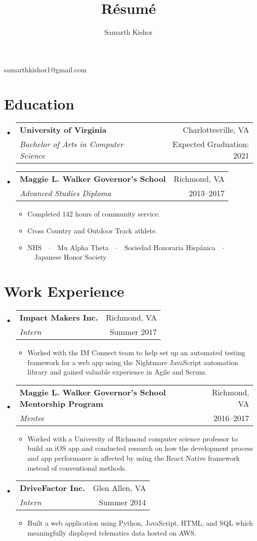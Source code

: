 \documentclass{article}
\makeatletter
\renewcommand{\maketitle}{
\begin{center}
{\huge\bfseries\theauthor}

\vspace{0.25em}

samarthkishor1@gmail.com

\end{center}}
\newcommand{\resumeSubHeadingListStart}{\begin{itemize}[leftmargin=*]}
\newcommand{\resumeSubHeadingListEnd}{\end{itemize}}
\newcommand{\workSubheading}[5]{
\item
\begin{tabular*}{\textwidth}{l@{\extracolsep{\fill}}r}
\textbf{\large#1} & {\small #2} \\
\textit{#3} & {#4}
\end{tabular*}
\vspace{-1em}
\begin{itemize}
\item #5
\end{itemize}
\vspace{0.25em}}
\newcommand{\eduSubheading}[4]{
\item
\begin{tabular*}{\textwidth}{l@{\extracolsep{\fill}}r}
\textbf{\large#1} & {\small #2} \\
\textit{#3} & {#4}
\end{tabular*}}
\makeatother
\begin{document}
\title{R\'esum\'e}
\author{Samarth Kishor}

\maketitle


\section{Education}

\resumeSubHeadingListStart
\eduSubheading{University of Virginia}{Charlottesville, VA}
{Bachelor of Arts in Computer Science}{Expected Graduation: 2021}

\eduSubheading{Maggie L. Walker Governor's School}{Richmond, VA}
{Advanced Studies Diploma}{2013--2017}
\vspace{-1em}
\begin{itemize}
\item Completed 142 hours of community service.
\item Cross Country and Outdoor Track athlete.
\item NHS\ \ $\cdotp$\ \ Mu Alpha Theta\ \ $\cdotp$\ \ Sociedad Honoraria Hisp\'anica\ \ $\cdotp$\ \ Japanese Honor Society
\end{itemize}
\resumeSubHeadingListEnd


\vspace{-1.5em}
\section{Work Experience}

\resumeSubHeadingListStart
\workSubheading{Impact Makers Inc.}{Richmond, VA}
{Intern}{Summer 2017}
{Worked with the IM Connect team to help set up an automated testing framework for a web app using the Nightmare JavaScript automation library and gained valuable experience in Agile and Scrum.}

\workSubheading{Maggie L. Walker Governor's School Mentorship Program}{Richmond, VA}
{Mentee}{2016--2017}
{Worked with a University of Richmond computer science professor to build an iOS app and conducted research on how the development process and app performance is affected by using the React Native framework instead of conventional methods.}

\workSubheading{DriveFactor Inc.}{Glen Allen, VA}
{Intern}{Summer 2014}
{Built a web application using Python, JavaScript, HTML, and SQL which meaningfully displayed telematics data hosted on AWS.}
\resumeSubHeadingListEnd
\end{document}
